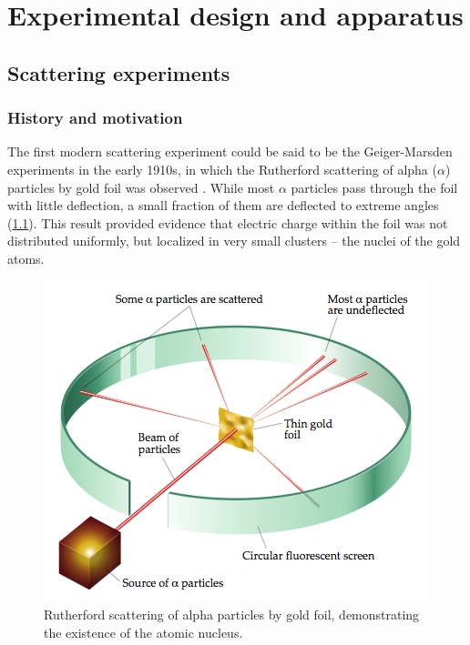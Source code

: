 \chapter{Experimental design and apparatus}
\label{ch:experiment}
\graphicspath{{Chapter-Experiment/figures/}}

\section{Scattering experiments}

\subsection{History and motivation}
The first modern scattering experiment could be said to be the Geiger-Marsden experiments in the early 1910s, in which the Rutherford scattering of alpha ($\alpha$) particles by gold foil was observed \cite{Rutherford:1911zz}.
While most $\alpha$ particles pass through the foil with little deflection, a small fraction of them are deflected to extreme angles (\cref{fig:rutherford}).
This result provided evidence that electric charge within the foil was not distributed uniformly, but localized in very small clusters -- the nuclei of the gold atoms.
\begin{figure}[t]
  \includegraphics{BLB-1070873-Rutherford_v2.jpg}
  \caption{Rutherford scattering of alpha particles by gold foil, demonstrating the existence of the atomic nucleus.}
  \label{fig:rutherford}
\end{figure}


